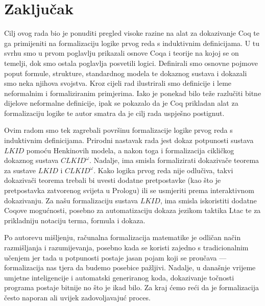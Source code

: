 \chapter{Zaključak}\label{cha:zakljucak}
Cilj ovog rada bio je ponuditi pregled visoke razine na alat za dokazivanje Coq te
ga primijeniti na formalizaciju logike prvog reda s induktivnim definicijama.
U tu svrhu smo u prvom poglavlju prikazali osnove Coqa i teorije na kojoj se on temelji,
dok smo ostala poglavlja posvetili logici.
Definirali smo osnovne pojmove poput formule, strukture, standardnog modela te dokaznog sustava
i dokazali smo neka njihova svojstva.
Kroz cijeli rad ilustrirali smo definicije i leme neformalnim i formaliziranim primjerima.
Iako je ponekad bilo teže razlučiti bitne dijelove neformalne definicije,
ipak se pokazalo da je Coq prikladan alat za formalizaciju logike te autor smatra
da je cilj rada uspješno postignut.

Ovim radom smo tek zagrebali površinu formalizacije logike prvog reda s induktivnim definicijama.
Prirodni nastavak rada jest dokaz potpunosti sustava \(\mathit{LKID}\) pomoću Henkinovih modela,
a nakon toga i formalizacija cikličkog dokaznog sustava \(\mathit{CLKID}^{\omega}\).
Nadalje, ima smisla formalizirati dokazivače teorema za sustave \(\mathit{LKID}\)
i \(\mathit{CLKID}^{\omega}\). Kako logika prvog reda nije odlučiva, takvi dokazivači teorema
trebali bi uvesti dodatne pretpostavke (kao što je pretpostavka zatvorenog svijeta u Prologu)
ili se usmjeriti prema interaktivnom dokazivanju.
Za našu formalizaciju sustava \(\mathit{LKID}\),
ima smisla iskoristiti dodatne Coqove mogućnosti,
posebno za automatizaciju dokaza jezikom taktika Ltac
te za prikladniju notaciju terma, formula i dokaza.

Po autorevu mišljenju, računalna formalizacija matematike je odličan način razmišljanja i razumijevanja,
posebno kada se koristi zajedno s tradicionalnim učenjem jer tada u potpunosti
postaje jasan pojam koji se proučava --- formalizacija nas tjera da budemo
posebice pažljivi. Nadalje, u današnje vrijeme umjetne inteligencije i automatski
generiranog koda, dokazivanje točnosti programa postaje bitnije no što je ikad bilo.
Za kraj ćemo reći da je formalizacija često naporan ali uvijek zadovoljavajuć proces.

